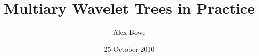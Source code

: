 \documentclass[a4paper]{article}
\begin{document}
\title{Multiary Wavelet Trees in Practice}
\author{Alex Bowe}
\date{25 October 2010}


\maketitle

\begin{abstract}

\end{abstract}


%

\newpage
\tableofcontents
\newpage





%







\appendix




\end{document}
